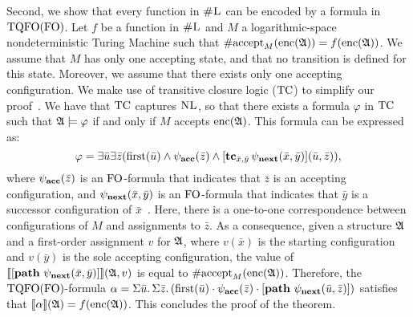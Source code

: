 Second, we show that every function in $\text{\sc \#L}$ can be encoded by a formula in ${\rm TQFO}({\rm FO})$.
Let $f$ be a function in $\text{\sc \#L}$ and $M$ a logarithmic-space nondeterministic  Turing Machine such that $\text{\rm \#accept}_M({\rm enc}(\mathfrak{A})) = f({\rm enc}(\mathfrak{A}))$. We assume that $M$ has only one accepting state, and that no transition is defined for this state. Moreover, we assume that there exists only one accepting configuration. We make use of transitive closure logic (${\rm TC}$) to simplify our proof~\cite{G07}. We have that ${\rm TC}$ captures $\text{\sc NL}$\cite{I83}, so that there exists a formula $\varphi$ in ${\rm TC}$ such that $\mathfrak{A}\models\varphi$ if and only if $M$ accepts ${\rm enc}(\mathfrak{A})$. This formula can be expressed as:
$$
\varphi = \exists\bar{u}\exists\bar{z}(\operatorname{first}(\bar{u})\wedge \psi_{\bf acc}(\bar{z})\wedge[{\bf tc}_{\bar{x},\bar{y}}\,\psi_{\bf next}(\bar{x},\bar{y})](\bar{u},\bar{z})),
$$
where $\psi_{\bf acc}(\bar{z})$ is an ${\rm FO}$-formula that indicates that $\bar{z}$ is an accepting configuration, and $\psi_{\bf next}(\bar{x},\bar{y})$ is an ${\rm FO}$-formula that indicates that $\bar{y}$ is a successor configuration of $\bar{x}$~\cite{G07}. Here, there is a one-to-one correspondence between configurations of $M$ and assignments to $\bar{z}$. As a consequence, given a structure $\mathfrak{A}$ and a first-order assignment $v$ for $\mathfrak{A}$, where $v(\bar{x})$ is the starting configuration and $v(\bar{y})$ is the sole accepting configuration, the value of ${\llbracket{}{[{\bf path} \,\, \psi_{\bf next}(\bar{x},\bar{y})]}\rrbracket}(\mathfrak{A},v)$ is equal to $\text{\rm \#accept}_M({\rm enc}(\mathfrak{A}))$.
Therefore, the ${\rm TQFO}({\rm FO})$-formula
$
\alpha = \Sigma{\bar{u}}.\,\Sigma{\bar{z}}.\,(\operatorname{first}(\bar{u})\cdot\psi_{\bf acc}(\bar{z})\cdot[{\bf path} \,\, \psi_{\bf next}(\bar{u},\bar{z})])
$
satisfies that ${\llbracket{}{\alpha}\rrbracket}(\mathfrak{A}) = f({\rm enc}(\mathfrak{A}))$. This concludes the proof of the theorem.